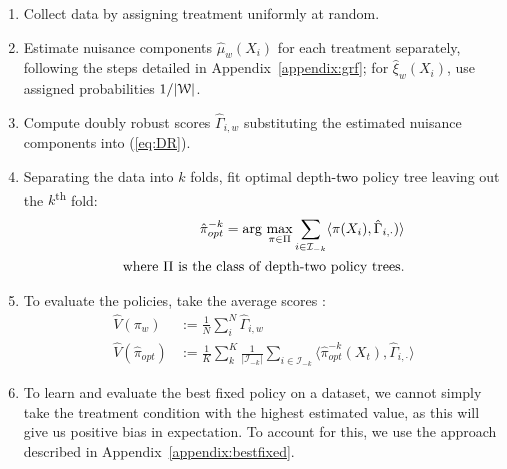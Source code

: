\documentclass[letterpaper, 12pt, parskip=full,]{scrartcl}
\begin{document}
\begin{enumerate}
  \item Collect data by assigning treatment uniformly at random.
  \item Estimate nuisance components $\hat{\mu}_{w}(X_i)$ for each treatment separately, following the steps detailed in Appendix~\ref{appendix:grf}; for  $\hat\xi_w(X_i)$, use assigned probabilities $1/|\ww|$. 
  \item Compute doubly robust scores $\hat{\Gamma}_{i,w}$ substituting the estimated nuisance components into (\ref{eq:DR}). 
  \item Separating the data into $k$ folds, fit optimal depth\textcolor{black}{-two} policy tree leaving out the $k$\textsuperscript{th} fold:
    \begin{align*}
      \hat{\pi}_{opt}^{-k} = \arg\max_{\pi \in \Pi}
       \sum_{i \in \mathcal{I}_{-k}}
      \langle \pi(X_{i}), \hat{\Gamma}_{i, \cdot}) \rangle \\
       \text{where } \Pi \text{ is the class of depth-\textcolor{black}{two} policy trees.}
    \end{align*}
  \item To evaluate the policies, take the average scores :
    \begin{align*}
          \hat{V}({\pi}_{w})  &:= \frac{1}{N} \sum_{i}^N \hat{\Gamma}_{i,w} \\
      \hat{V}(\hat{\pi}_{opt})  
					 &:= \frac{1}{K} \sum_{k}^K  \frac{1}{|\mathcal{I}_{-k}|} \sum_{i \in \mathcal{I}_{-k} }
          \langle \hat{\pi}_{opt}^{-k}(X_{t}), \hat{\Gamma}_{i, \cdot} \rangle
          \end{align*}
   \item To learn and evaluate the best fixed policy on a dataset, we cannot simply take the treatment condition with the highest estimated value, as this will give us positive bias in expectation. To account for this, we use the approach described in Appendix~\ref{appendix:bestfixed}. 
\end{enumerate}
\end{document}
